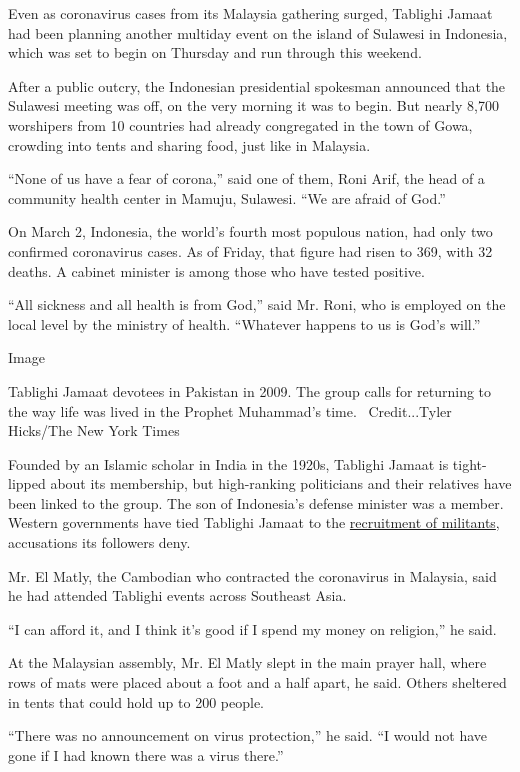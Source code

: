 Even as coronavirus cases from its Malaysia gathering surged, Tablighi
Jamaat had been planning another multiday event on the island of
Sulawesi in Indonesia, which was set to begin on Thursday and run
through this weekend.

After a public outcry, the Indonesian presidential spokesman announced
that the Sulawesi meeting was off, on the very morning it was to begin.
But nearly 8,700 worshipers from 10 countries had already congregated in
the town of Gowa, crowding into tents and sharing food, just like in
Malaysia.

``None of us have a fear of corona,'' said one of them, Roni Arif, the
head of a community health center in Mamuju, Sulawesi. ``We are afraid
of God.''

On March 2, Indonesia, the world's fourth most populous nation, had only
two confirmed coronavirus cases. As of Friday, that figure had risen to
369, with 32 deaths. A cabinet minister is among those who have tested
positive.

``All sickness and all health is from God,'' said Mr. Roni, who is
employed on the local level by the ministry of health. ``Whatever
happens to us is God's will.''

Image

Tablighi Jamaat devotees in Pakistan in 2009. The group calls for
returning to the way life was lived in the Prophet Muhammad's time.
~Credit...Tyler Hicks/The New York Times

Founded by an Islamic scholar in India in the 1920s, Tablighi Jamaat is
tight-lipped about its membership, but high-ranking politicians and
their relatives have been linked to the group. The son of Indonesia's
defense minister was a member. Western governments have tied Tablighi
Jamaat to the
\href{https://www.nytimes3xbfgragh.onion/2003/07/14/us/a-muslim-missionary-group-draws-new-scrutiny-in-us.html}{recruitment
of militants}, accusations its followers deny.

Mr. El Matly, the Cambodian who contracted the coronavirus in Malaysia,
said he had attended Tablighi events across Southeast Asia.

``I can afford it, and I think it's good if I spend my money on
religion,'' he said.

At the Malaysian assembly, Mr. El Matly slept in the main prayer hall,
where rows of mats were placed about a foot and a half apart, he said.
Others sheltered in tents that could hold up to 200 people.

``There was no announcement on virus protection,'' he said. ``I would
not have gone if I had known there was a virus there.''

